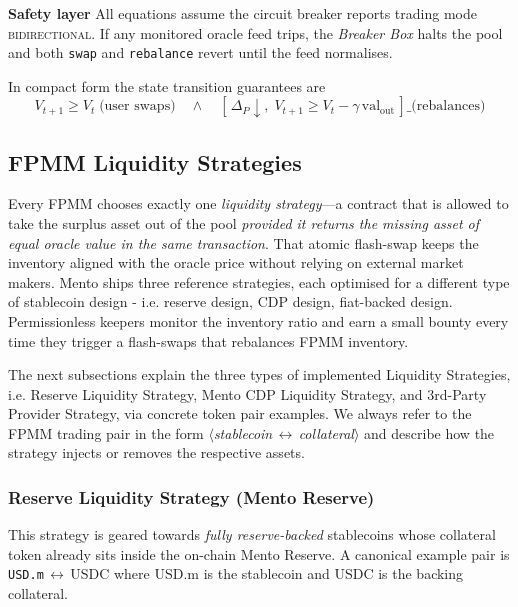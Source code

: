 \documentclass[a4paper]{article}
\providecommand{\hyp}{-}
\theoremstyle{definition}
\begin{document}
\medskip\noindent\textbf{Safety layer}
All equations assume the circuit breaker reports trading mode
\textsc{bidirectional}.  If any monitored oracle feed trips, the \emph{Breaker
Box} halts the pool and both \verb|swap| and \verb|rebalance| revert until the
feed normalises.

\medskip
In compact form the state transition guarantees are
\[
  \boxed{V_{t+1} \ge V_t \;\text{(user swaps)}\quad\wedge\quad
          [\,\Delta_P\downarrow,\;V_{t+1} \ge V_t - \gamma\,\mathrm{val}_{\text{out}}\,]\_{\text{(rebalances)}}}
\]

\subsection{FPMM Liquidity Strategies}\label{sec:liquidity_strategy_details}
Every FPMM chooses exactly one 
\emph{liquidity strategy}—a contract that is allowed to take the surplus asset
out of the pool \emph{provided it returns the missing asset of equal oracle
value in the \emph{same} transaction}.  That atomic flash\hyp swap keeps the
inventory aligned with the oracle price without relying on external market
makers.  Mento ships three reference strategies, each optimised for a different
type of stablecoin design - i.e. reserve design, CDP design, fiat-backed design. Permissionless keepers monitor the inventory ratio and earn a small bounty every time they trigger a flash\hyp swaps that rebalances FPMM inventory.

\bigskip

The next subsections explain the three types of implemented Liquidity Strategies, i.e. Reserve Liquidity Strategy, Mento CDP Liquidity Strategy, and 3rd\hyp Party Provider Strategy, via concrete token pair examples. We always
refer to the FPMM trading pair in the form
$\langle$\emph{stablecoin}\,$\leftrightarrow$\,\emph{collateral}$\rangle$ and
describe how the strategy injects or removes the respective assets.

\subsubsection{Reserve Liquidity Strategy (Mento Reserve)}\label{str:reserve}
This strategy is geared towards \emph{fully
reserve-backed} stablecoins whose collateral token already sits inside the
on-chain Mento Reserve.  A canonical example pair is
\texttt{USD.m}\,$\leftrightarrow$\,USDC where USD.m is the stablecoin and USDC
is the backing collateral.\\
\end{document}
